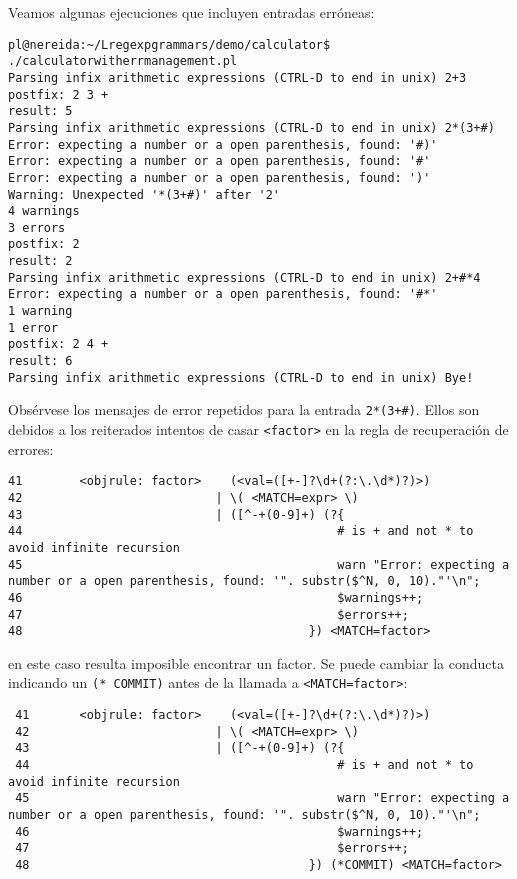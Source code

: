 Veamos algunas ejecuciones que incluyen entradas erróneas:
\begin{verbatim}
pl@nereida:~/Lregexpgrammars/demo/calculator$ ./calculatorwitherrmanagement.pl
Parsing infix arithmetic expressions (CTRL-D to end in unix) 2+3
postfix: 2 3 +
result: 5
Parsing infix arithmetic expressions (CTRL-D to end in unix) 2*(3+#)
Error: expecting a number or a open parenthesis, found: '#)'
Error: expecting a number or a open parenthesis, found: '#'
Error: expecting a number or a open parenthesis, found: ')'
Warning: Unexpected '*(3+#)' after '2'
4 warnings
3 errors
postfix: 2
result: 2
Parsing infix arithmetic expressions (CTRL-D to end in unix) 2+#*4
Error: expecting a number or a open parenthesis, found: '#*'
1 warning
1 error
postfix: 2 4 +
result: 6
Parsing infix arithmetic expressions (CTRL-D to end in unix) Bye!
\end{verbatim}
Obsérvese los mensajes de error repetidos para la entrada 
\verb|2*(3+#)|. Ellos son debidos a los reiterados intentos de
casar \verb|<factor>| en la regla de recuperación de errores:
\begin{verbatim}
41        <objrule: factor>    (<val=([+-]?\d+(?:\.\d*)?)>)
42                           | \( <MATCH=expr> \)
43                           | ([^-+(0-9]+) (?{
44                                            # is + and not * to avoid infinite recursion
45                                            warn "Error: expecting a number or a open parenthesis, found: '". substr($^N, 0, 10)."'\n";
46                                            $warnings++;
47                                            $errors++;
48                                        }) <MATCH=factor>
\end{verbatim}
en este caso resulta imposible encontrar un factor.
Se puede cambiar la conducta indicando un \verb|(* COMMIT)| antes de la
llamada a \verb|<MATCH=factor>|:
\begin{verbatim}
 41       <objrule: factor>    (<val=([+-]?\d+(?:\.\d*)?)>)
 42                          | \( <MATCH=expr> \)
 43                          | ([^-+(0-9]+) (?{
 44                                           # is + and not * to avoid infinite recursion
 45                                           warn "Error: expecting a number or a open parenthesis, found: '". substr($^N, 0, 10)."'\n";
 46                                           $warnings++;
 47                                           $errors++;
 48                                       }) (*COMMIT) <MATCH=factor>
\end{verbatim}

